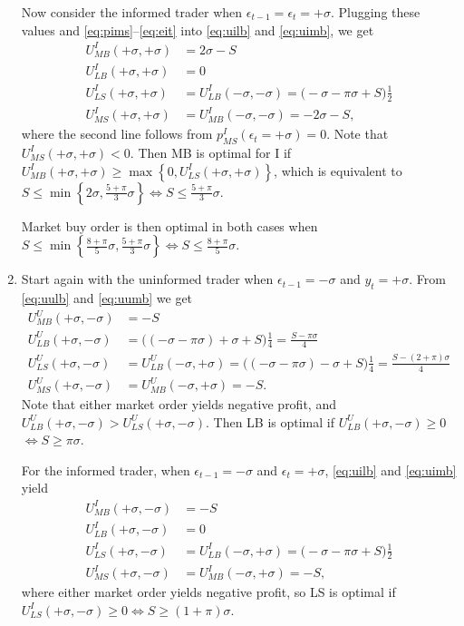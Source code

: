 \documentclass[a4paper]{article}
\begin{document}
\begin{enumerate}
	Now consider the informed trader when $\epsilon_{t-1} = \epsilon_t = +\sigma$. Plugging these values and \eqref{eq:pims}--\eqref{eq:eit} into \eqref{eq:uilb} and \eqref{eq:uimb}, we get
	\begin{align*}
		U^I_{MB}(+\sigma, +\sigma) &= 2 \sigma - S
		\\
		U^I_{LB}(+\sigma, +\sigma) &= 0
		\\
		U^I_{LS}(+\sigma, +\sigma) &= U^I_{LB}(-\sigma, -\sigma) = \Big( - \sigma - \pi \sigma + S \Big) \frac{1}{2}
		\\
		U^I_{MS}(+\sigma, +\sigma) &= U^I_{MB}(-\sigma, -\sigma) = -2\sigma - S,
	\end{align*}
	where the second line follows from $p_{MS}^I(\epsilon_t=+\sigma) = 0$. Note that $U^I_{MS}(+\sigma, +\sigma) < 0$. Then MB is optimal for I if $U^I_{MB}(+\sigma, +\sigma) \geq \max \left\{ 0, U^I_{LS}(+\sigma, +\sigma) \right\}$, which is equivalent to $S \leq \min \left\{ 2\sigma, \frac{5+\pi}{3}\sigma \right\} \iff S \leq \frac{5+\pi}{3}\sigma$.
	
	Market buy order is then optimal in both cases when $S \leq \min \left\{ \frac{8+\pi}{5}\sigma, \frac{5+\pi}{3}\sigma \right\} \iff S \leq \frac{8+\pi}{5}\sigma$.
	
	\item Start again with the uninformed trader when $\epsilon_{t-1} = -\sigma$ and $y_t = +\sigma$. From \eqref{eq:uulb} and \eqref{eq:uumb} we get
	\begin{align*}
		U^U_{MB}(+\sigma, -\sigma) &= - S
		\\
		U^U_{LB}(+\sigma, -\sigma) &= \Big( (-\sigma-\pi\sigma)+ \sigma + S \Big) \frac{1}{4} = \frac{S - \pi \sigma}{4}
		\\
		U^U_{LS}(+\sigma, -\sigma) &= U^U_{LB}(-\sigma, +\sigma) = \Big( (-\sigma-\pi\sigma)- \sigma + S \Big) \frac{1}{4} = \frac{S - (2+\pi) \sigma}{4}
		\\
		U^U_{MS}(+\sigma, -\sigma) &= U^U_{MB}(-\sigma, +\sigma) = - S.
	\end{align*}
	Note that either market order yields negative profit, and $U^U_{LB}(+\sigma, -\sigma) > U^U_{LS}(+\sigma, -\sigma)$. Then LB is optimal if $U^U_{LB}(+\sigma, -\sigma) \geq 0$ $\iff S \geq \pi \sigma$.
	
	For the informed trader, when $\epsilon_{t-1} = -\sigma$ and $\epsilon_t = +\sigma$, \eqref{eq:uilb} and \eqref{eq:uimb} yield
	\begin{align*}
		U^I_{MB}(+\sigma, -\sigma) &= -S
		\\
		U^I_{LB}(+\sigma, -\sigma) &= 0
		\\
		U^I_{LS}(+\sigma, -\sigma) &= U^I_{LB}(-\sigma, +\sigma) = \Big( - \sigma - \pi \sigma + S \Big) \frac{1}{2}
		\\
		U^I_{MS}(+\sigma, -\sigma) &= U^I_{MB}(-\sigma, +\sigma) = -S,
	\end{align*}
	where either market order yields negative profit, so LS is optimal if $U^I_{LS}(+\sigma, -\sigma) \geq 0 \iff S \geq (1+\pi)\sigma$.
	

\end{enumerate}
\end{document}
